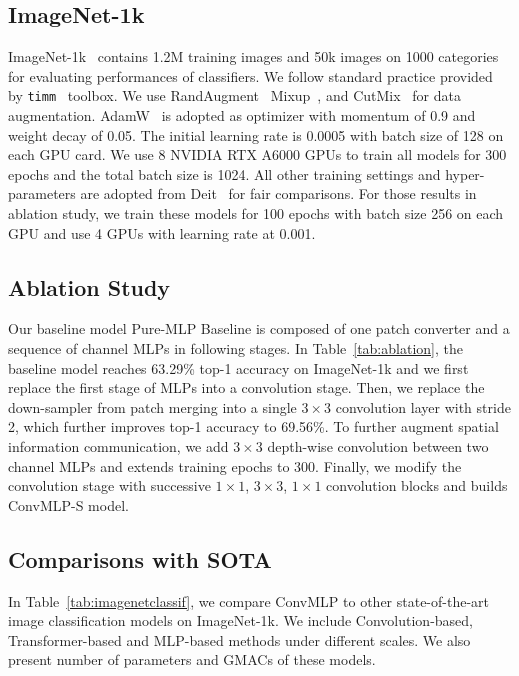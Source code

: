 \documentclass[final]{cvpr}
\begin{document}
\subsection{ImageNet-1k}
ImageNet-1k~\cite{krizhevsky2012imagenet} contains 1.2M training images and 50k images on 1000 categories for evaluating performances of classifiers. We follow standard practice provided by \verb|timm|~\cite{rw2019timm} toolbox. We use RandAugment~\cite{cubuk2020randaugment} Mixup~\cite{zhang2017mixup}, and CutMix~\cite{yun2019cutmix} for data augmentation. AdamW~\cite{loshchilov2017decoupled} is adopted as optimizer with momentum of 0.9 and weight decay of 0.05. The initial learning rate is 0.0005 with batch size of 128 on each GPU card. We use 8 NVIDIA RTX A6000 GPUs to train all models for 300 epochs and the total batch size is 1024. All other training settings and hyper-parameters are adopted from Deit~\cite{touvron2021training} for fair comparisons. For those results in ablation study, we train these models for 100 epochs with batch size 256 on each GPU and use 4 GPUs with learning rate at 0.001.

\subsection{Ablation Study}
Our baseline model Pure-MLP Baseline is composed of one patch converter and a sequence of channel MLPs in following stages. In Table~\ref{tab:ablation}, the baseline model reaches 63.29\% top-1 accuracy on ImageNet-1k and we first replace the first stage of MLPs into a convolution stage. Then, we replace the down-sampler from patch merging into a single $3\times3$ convolution layer with stride 2, which further improves top-1 accuracy to 69.56\%. To further augment spatial information communication, we add $3\times3$ depth-wise convolution between two channel MLPs and extends training epochs to 300. Finally, we modify the convolution stage with successive $1\times1$, $3\times3$, $1\times1$ convolution blocks and builds ConvMLP-S model. 

\subsection{Comparisons with SOTA}
In Table~\ref{tab:imagenetclassif}, we compare ConvMLP to other state-of-the-art image classification models on ImageNet-1k. We include Convolution-based, Transformer-based and MLP-based methods under different scales. We also present number of parameters and GMACs of these models. 
\end{document}
